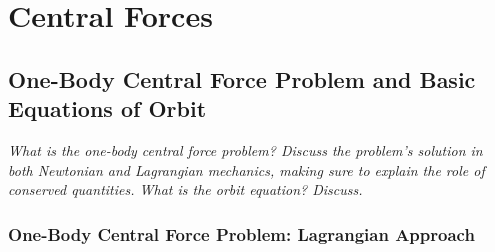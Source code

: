 \documentclass[11pt, a4paper]{article}
\begin{document}
\section{Central Forces}
\subsection{One-Body Central Force Problem and Basic Equations of Orbit}
\textit{What is the one-body central force problem? Discuss the problem's solution in both Newtonian and Lagrangian mechanics, making sure to explain the role of conserved quantities. What is the orbit equation? Discuss.}

\subsubsection{One-Body Central Force Problem: Lagrangian Approach}
\end{document}
